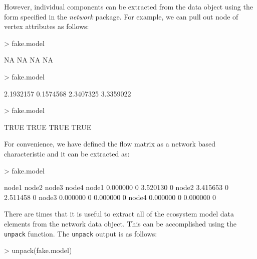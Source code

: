 \documentclass[11pt]{article}
\begin{document}
However, individual components can be extracted from the data object
using the form specified in the \textit{network} package.  For
example, we can pull out node of vertex attributes as follows:

\begin{Schunk}
\begin{Sinput}
> fake.model%
\end{Sinput}
\begin{Soutput}
[1] NA NA NA NA
\end{Soutput}
\begin{Sinput}
> fake.model%
\end{Sinput}
\begin{Soutput}
[1] 2.1932157 0.1574568 2.3407325 3.3359022
\end{Soutput}
\begin{Sinput}
> fake.model%
\end{Sinput}
\begin{Soutput}
[1] TRUE TRUE TRUE TRUE
\end{Soutput}
\end{Schunk}

For convenience, we have defined the flow matrix as a network based
characteristic and it can be extracted as:
\begin{Schunk}
\begin{Sinput}
> fake.model%
\end{Sinput}
\begin{Soutput}
         node1 node2    node3 node4
node1 0.000000     0 3.520130     0
node2 3.415653     0 2.511458     0
node3 0.000000     0 0.000000     0
node4 0.000000     0 0.000000     0
\end{Soutput}
\end{Schunk}

There are times that it is useful to extract all of the ecosystem
model data elements from the network data object.  This can be
accomplished using the \texttt{unpack} function. The \texttt{unpack}
output is as follows:

\begin{Schunk}
\begin{Sinput}
> unpack(fake.model)  
\end{Sinput}
\end{Schunk}
\end{document}
